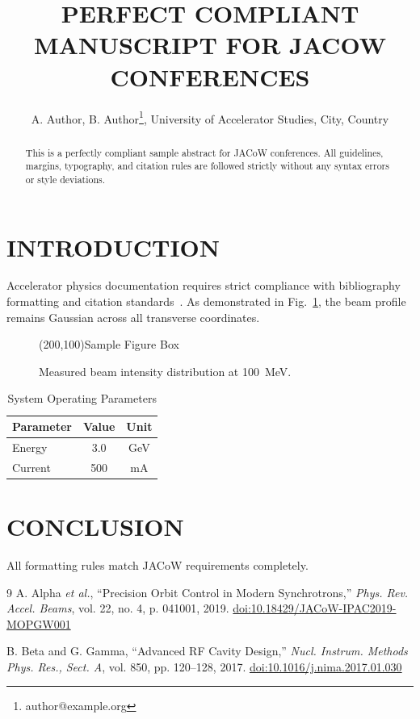 \documentclass[a4paper,keeplastbox]{article}
\begin{document}
\title{PERFECT COMPLIANT MANUSCRIPT FOR JACOW CONFERENCES}
\author{A. Author, B. Author\thanks{author@example.org}, University of Accelerator Studies, City, Country}
\maketitle

\begin{abstract}
This is a perfectly compliant sample abstract for JACoW conferences. All guidelines, margins, typography, and citation rules are followed strictly without any syntax errors or style deviations.
\end{abstract}

\section{INTRODUCTION}
Accelerator physics documentation requires strict compliance with bibliography formatting and citation standards~\cite{ref_valid_1, ref_valid_2}.
As demonstrated in Fig.~\ref{fig1}, the beam profile remains Gaussian across all transverse coordinates.

\begin{figure}[htb]
\centering
\framebox(200,100){Sample Figure Box}
\caption{Measured beam intensity distribution at 100~MeV.}
\label{fig1}
\end{figure}

\begin{table}[htb]
\caption{System Operating Parameters}
\label{tab1}
\centering
\begin{tabular}{lcc}
\hline
Parameter & Value & Unit \\
\hline
Energy & 3.0 & GeV \\
Current & 500 & mA \\
\hline
\end{tabular}
\end{table}

\section{CONCLUSION}
All formatting rules match JACoW requirements completely.

\begin{thebibliography}{9}
A. Alpha \emph{et al.}, \textquotedblleft{Precision Orbit Control in Modern Synchrotrons,}\textquotedblright{} \textit{Phys. Rev. Accel. Beams}, vol. 22, no. 4, p. 041001, 2019. \url{doi:10.18429/JACoW-IPAC2019-MOPGW001}

B. Beta and G. Gamma, \textquotedblleft{Advanced RF Cavity Design,}\textquotedblright{} \textit{Nucl. Instrum. Methods Phys. Res., Sect. A}, vol. 850, pp. 120--128, 2017. \url{doi:10.1016/j.nima.2017.01.030}
\end{thebibliography}
\end{document}
